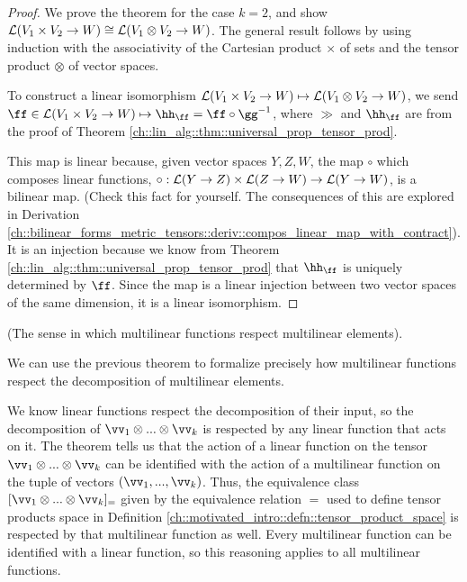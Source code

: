 \begin{proof}
    We prove the theorem for the case $k = 2$, and show $\mathcal{L}(V_1 \times V_2 \rightarrow W) \cong \mathcal{L}(V_1 \otimes V_2 \rightarrow W)$. The general result follows by using induction with the associativity of the Cartesian product $\times$ of sets and the tensor product $\otimes$ of vector spaces.
    
    To construct a linear isomorphism $\mathcal{L}(V_1 \times V_2 \rightarrow W) \mapsto \mathcal{L}(V_1 \otimes V_2 \rightarrow W)$, we send \\ ${\ff \in \LLLL(V_1 \times V_2 \rightarrow W) \mapsto \hh_\ff = \ff \circ \gg^{-1}}$, where $\gg$ and $\hh_\ff$ are from the proof of Theorem \ref{ch::lin_alg::thm::universal_prop_tensor_prod}.
    
    This map is linear because, given vector spaces $Y, Z, W$, the map $\circ$ which composes linear functions, $\circ:\mathcal{L}(Y \rightarrow Z) \times \mathcal{L}(Z \rightarrow W) \rightarrow \mathcal{L}(Y \rightarrow W)$, is a bilinear map. (Check this fact for yourself. The consequences of this are explored in Derivation \ref{ch::bilinear_forms_metric_tensors::deriv::compos_linear_map_with_contract}). It is an injection because we know from Theorem \ref{ch::lin_alg::thm::universal_prop_tensor_prod} that $\hh_\ff$ is uniquely determined by $\ff$. Since the map is a linear injection between two vector spaces of the same dimension, it is a linear isomorphism.
\end{proof}

\begin{remark}
    (The sense in which multilinear functions respect multilinear elements).
    
    We can use the previous theorem to formalize precisely how multilinear functions respect the decomposition of multilinear elements.
    
    We know linear functions respect the decomposition of their input, so the decomposition of $\vv_1 \otimes ... \otimes \vv_k$ is respected by any linear function that acts on it. The theorem tells us that the action of a linear function on the tensor $\vv_1 \otimes ... \otimes \vv_k$ can be identified with the action of a multilinear function on the tuple of vectors $(\vv_1, ..., \vv_k)$. Thus, the equivalence class $[\vv_1 \otimes ... \otimes \vv_k]_=$ given by the equivalence relation $=$ used to define tensor products space in Definition \ref{ch::motivated_intro::defn::tensor_product_space} is respected by that multilinear function as well. Every multilinear function can be identified with a linear function, so this reasoning applies to all multilinear functions.
\end{remark}

